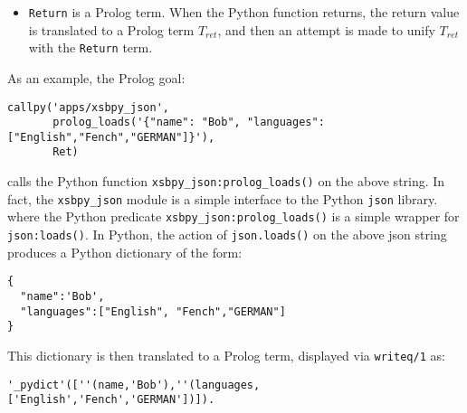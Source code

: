 \begin{description}
\begin{itemize}
\begin{itemize}
         {\tt '\_\$pydict'(DictList)}

         where {\tt DictList} is a list of terms of the form

         {\tt ''(Key,Value)}

         where {\tt Key} and {\tt Value} are the translations of any
         Python data structures that are both allowable as a
         dictionary key or value, and supported by {\tt xsbpy}.  For
         instance, {\tt Value} can be a list, a set, a tuple or another
         dictionary.

       \item {\em Set Types}: A Python set {\em S} is translated to
         a structure of the form

         {\tt '\_\$pyset'(SetList)}

         where {\em SetList} is the list containing exactly the
         translated elements of $S$.  Due to Python's implementation
         of sets, there is no guarantee that the order of $S$ and
         $SetList$ will be the same.
       \item {\em Boolean Types:} are not yet supported. (Soon!)
       \item {\em Binary Types:} are not yet supported.  There are no
         current plans to support this type.
     \end{itemize}
   \item {\tt Return} is a Prolog term.  When the Python function
     returns, the return value is translated to a Prolog term
     $T_{ret}$, and then an attempt is made to unify $T_{ret}$ with
     the {\tt Return} term.
 \end{itemize}

 As an example, the Prolog goal:

 \begin{verbatim}
callpy('apps/xsbpy_json',
       prolog_loads('{"name": "Bob", "languages": ["English","Fench","GERMAN"]}'),
       Ret)
\end{verbatim}
 
\noindent 
calls the Python function {\tt xsbpy\_json:prolog\_loads()} on the
above string.  In fact, the {\tt xsbpy\_json} module is a simple
interface to the Python {\tt json} library. where the Python predicate
{\tt xsbpy\_json:prolog\_loads()} is a simple wrapper for {\tt
  json:loads()}.  In Python, the action of {\tt json.loads()} on the
above json string produces a Python dictionary of the form:
\begin{verbatim}
{
  "name":'Bob',
  "languages":["English", "Fench","GERMAN"]
}
\end{verbatim}
This dictionary is then translated to a Prolog term, displayed via
{\tt writeq/1} as:
\begin{verbatim}
'_pydict'([''(name,'Bob'),''(languages,['English','Fench','GERMAN'])]).
\end{verbatim}


\end{description}

